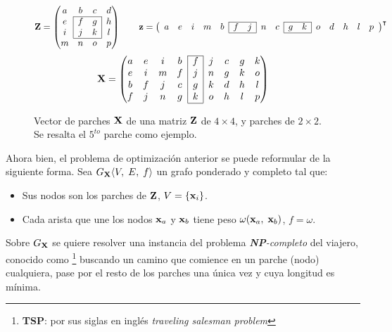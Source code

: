 \begin{figure}[H]
	\[\Z = \left(
		\begin{matrix}
			a & b & c & d\\\cline{2-3}
			e & \multicolumn{1}{|c}{f} & \multicolumn{1}{c|}{g} & h\\
			i & \multicolumn{1}{|c}{j} & \multicolumn{1}{c|}{k} & l\\\cline{2-3}
			m & n & o & p\\
		\end{matrix}
	\right)
	\qquad\z = \left(
		\begin{array}{ccccc|cc|cc|cc|ccccc}
			\cline{6-7}\cline{10-11}
			a & e & i & m & b & f & j & n & c & g & k & o & d & h & l & p \\
			\cline{6-7}\cline{10-11}
		\end{array}
	\right)^\intercal\]
	\[\X = \left(
		\begin{matrix}\cline{5-5}
			a & e & i & b & \multicolumn{1}{|c|}{f} & j & c & g & k\\
			e & i & m & f & \multicolumn{1}{|c|}{j} & n & g & k & o\\
			b & f & j & c & \multicolumn{1}{|c|}{g} & k & d & h & l\\
			f & j & n & g & \multicolumn{1}{|c|}{k} & o & h & l & p\\\cline{5-5}
		\end{matrix}
	\right)\]
	\caption{Vector de parches $\mathbf{X}$ de una matriz $\mathbf{Z}$ de $4 \times 4$, y parches de $2 \times 2$. Se resalta el $5^{to}$ parche como ejemplo.}
	\label{ex:vector_X}
\end{figure}

Ahora bien, el problema de optimizaci\'on anterior se puede reformular de la siguiente forma. Sea $G_{\mathbf{X}} \langle V,\;E,\;f\rangle$ un grafo ponderado y completo \cite{west2001introduction} tal que:
\begin{itemize}
	\item Sus nodos son los parches de $\mathbf{Z}$, $V = \{\mathbf{x}_i\}$.
	\item Cada arista que une los nodos $\mathbf{x}_a$ y $\mathbf{x}_b$ tiene peso $\omega(\mathbf{x}_a,\; \mathbf{x}_b)$, $f = \omega$.
\end{itemize}
Sobre $G_{\mathbf{X}}$ se quiere resolver una instancia del problema \textit{\textbf{NP}-completo} del viajero, conocido como \TSP\footnote{\textbf{TSP}: por sus siglas en ingl\'es \textit{traveling salesman problem}} \cite{cormen2009introduction,enwiki:tsp} buscando un camino que comience en un parche (nodo) cualquiera, pase por el resto de los parches una \'unica vez y cuya longitud es m\'inima.


